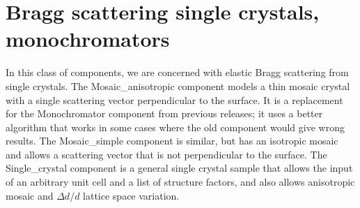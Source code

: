 
\chapter{Bragg scattering single crystals, monochromators}

In this class of components, we are concerned with elastic Bragg
scattering from single crystals. The Mosaic\_anisotropic component
models a thin mosaic crystal with a single scattering vector
perpendicular to the surface. It is a replacement for the Monochromator
component from previous releases; it uses a better algorithm that works
in some cases where the old component would give wrong results. The
Mosaic\_simple component is similar, but has an isotropic mosaic and
allows a scattering vector that is not perpendicular to the surface. The
Single\_crystal component is a general single crystal sample that allows
the input of an arbitrary unit cell and a list of structure factors, and
also allows anisotropic mosaic and $\Delta d/d$ lattice space variation.




